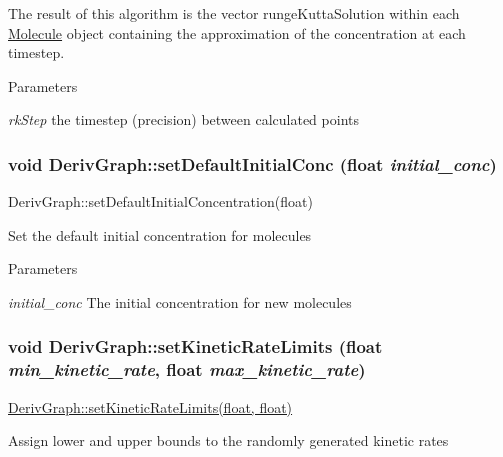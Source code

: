 The result of this algorithm is the vector rungeKuttaSolution within each \hyperlink{classMolecule}{Molecule} object containing the approximation of the concentration at each timestep.


\begin{DoxyParams}{Parameters}
\item[{\em rkStep}]the timestep (precision) between calculated points \end{DoxyParams}
\hypertarget{classDerivGraph_ab0a014cac7227943fe67f85f52d4e613}{
\subsubsection[{setDefaultInitialConc}]{\setlength{\rightskip}{0pt plus 5cm}void DerivGraph::setDefaultInitialConc (float {\em initial\_\-conc})}}
\label{classDerivGraph_ab0a014cac7227943fe67f85f52d4e613}
DerivGraph::setDefaultInitialConcentration(float)

Set the default initial concentration for molecules


\begin{DoxyParams}{Parameters}
\item[{\em initial\_\-conc}]The initial concentration for new molecules \end{DoxyParams}
\hypertarget{classDerivGraph_a79249de71c4c870277abed71d484e2d5}{
\subsubsection[{setKineticRateLimits}]{\setlength{\rightskip}{0pt plus 5cm}void DerivGraph::setKineticRateLimits (float {\em min\_\-kinetic\_\-rate}, \/  float {\em max\_\-kinetic\_\-rate})}}
\label{classDerivGraph_a79249de71c4c870277abed71d484e2d5}
\hyperlink{classDerivGraph_a79249de71c4c870277abed71d484e2d5}{DerivGraph::setKineticRateLimits(float, float)}

Assign lower and upper bounds to the randomly generated kinetic rates



